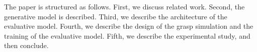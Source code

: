 
The paper is structured as follows. First, we discuss related work. Second, the generative model is described. Third, we describe the architecture of the evaluative model. Fourth, we describe the design of the grasp simulation and the training of the evaluative model. Fifth, we describe the experimental study, and then conclude.

